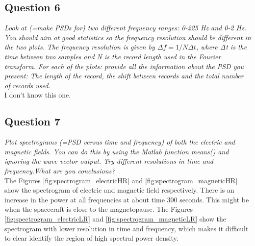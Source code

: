 \documentclass{article}
\begin{document}
\subsection{Question 6}
\textit{Look at (=make PSDs for) two different frequency ranges: 0-225 Hz and 0-2 Hz. You should aim at good statistics so the frequency resolution should be different in the two plots. The frequency resolution is given by $Δf=1/NΔt$, where Δt is the time between two samples and N is the record length used in the Fourier transform. For each of the plots: provide all the information about the PSD you present: The length of the record, the shift between records and the total number of records used.}\\

{\color{red} I don't know this one.}


\subsection{Question 7}
\textit{Plot spectrograms (=PSD versus time and frequency) of both the electric and magnetic fields. You can do this by using the Matlab function means() and ignoring the wave vector output. Try different resolutions in time and frequency.What are you conclusions?}\\

The Figures \ref{fig:spectrogram_electricHR} and \ref{fig:spectrogram_magneticHR} show the spectrogram of electric and magnetic field respectively. There is an increase in the power at all frequencies at about time 300 seconds. This might be when the spacecraft is close to the magnetopause. The Figures \ref{fig:spectrogram_electricLR} and \ref{fig:spectrogram_magneticLR} show the spectrogram with lower resolution in time and frequency, which makes it difficult to clear identify the region of high spectral power density.
\end{document}
